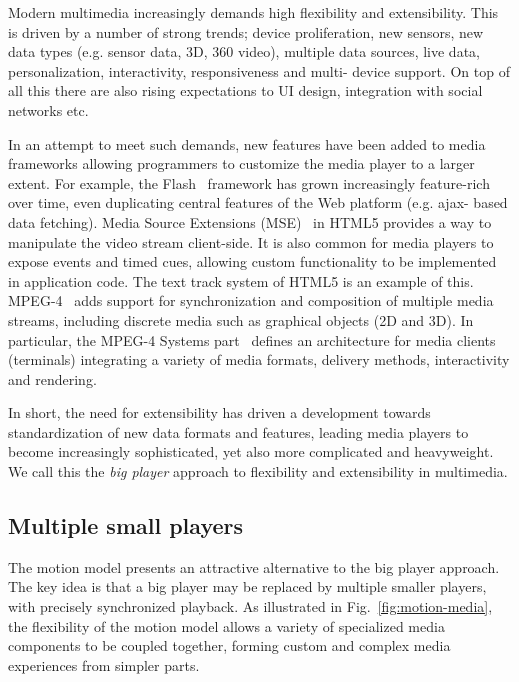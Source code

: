 Modern multimedia increasingly demands high flexibility and extensibility.
This is driven by a number of strong trends; device proliferation, new
sensors, new data types (e.g. sensor data, 3D, 360 video), multiple data
sources, live data, personalization, interactivity, responsiveness and multi-
device support. On top of all this there are also rising expectations to UI
design, integration with social networks etc.

In an attempt to meet such demands, new features have been added to media
frameworks allowing programmers to customize the media player to a larger
extent. For example, the Flash~\cite{flash} framework has grown increasingly feature-rich
over time, even duplicating central features of the Web platform (e.g. ajax-
based data fetching). Media Source Extensions (MSE)~\cite{mse} in HTML5 provides a way to
manipulate the video stream client-side. It is also common for media players
to expose events and timed cues, allowing custom functionality to be
implemented in application code. The text track system of HTML5 is an example
of this. MPEG-4~\cite{mpeg4} adds support for synchronization and composition of
multiple media streams, including discrete media such as graphical objects (2D
and 3D). In particular, the MPEG-4 Systems part~\cite{mpeg4sys} defines an architecture
for media clients (terminals) integrating a variety of media formats, delivery
methods, interactivity and rendering.

In short, the need for extensibility has driven a development towards
standardization of new data formats and features, leading media players to
become increasingly sophisticated, yet also more complicated and heavyweight.
We call this the \emph{big player} approach to flexibility and extensibility in
multimedia.


\subsection{Multiple small players}

The motion model presents an attractive alternative to the big player
approach. The key idea is that a big player may be replaced by multiple
smaller players, with precisely synchronized playback. As illustrated in
Fig.~\ref{fig:motion-media}, the flexibility of the motion model allows a
variety of specialized media components to be coupled together, forming custom
and complex media experiences from simpler parts.


